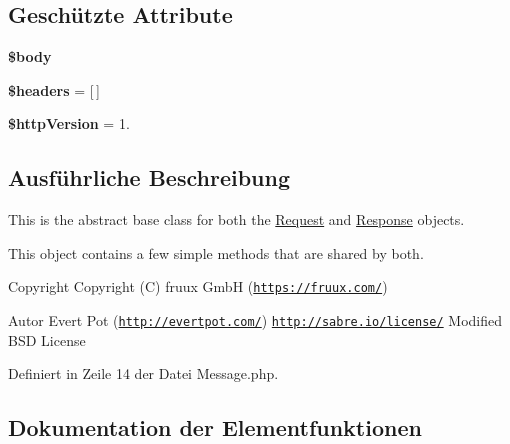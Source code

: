 \subsection*{Geschützte Attribute}
\begin{DoxyCompactItemize}
\item 
\mbox{\label{class_sabre_1_1_h_t_t_p_1_1_message_aa7882b8ecea7c480903d72055513a7f1}} 
{\bfseries \$body}
\item 
\mbox{\label{class_sabre_1_1_h_t_t_p_1_1_message_aa48b6058fad21b4cf6495f7423440456}} 
{\bfseries \$headers} = \mbox{[}$\,$\mbox{]}
\item 
\mbox{\label{class_sabre_1_1_h_t_t_p_1_1_message_aa7276a27a26142c71007f19f09e75a42}} 
{\bfseries \$http\+Version} = \textquotesingle{}1.\textquotesingle{}
\end{DoxyCompactItemize}


\subsection{Ausführliche Beschreibung}
This is the abstract base class for both the \mbox{\hyperlink{class_sabre_1_1_h_t_t_p_1_1_request}{Request}} and \mbox{\hyperlink{class_sabre_1_1_h_t_t_p_1_1_response}{Response}} objects.

This object contains a few simple methods that are shared by both.

\begin{DoxyCopyright}{Copyright}
Copyright (C) fruux GmbH (\href{https://fruux.com/}{\tt https\+://fruux.\+com/}) 
\end{DoxyCopyright}
\begin{DoxyAuthor}{Autor}
Evert Pot (\href{http://evertpot.com/}{\tt http\+://evertpot.\+com/})  \href{http://sabre.io/license/}{\tt http\+://sabre.\+io/license/} Modified B\+SD License 
\end{DoxyAuthor}


Definiert in Zeile 14 der Datei Message.\+php.



\subsection{Dokumentation der Elementfunktionen}
\mbox{\label{class_sabre_1_1_h_t_t_p_1_1_message_a0eeb8ea72e67ded5a4c08f940298a321}} 
